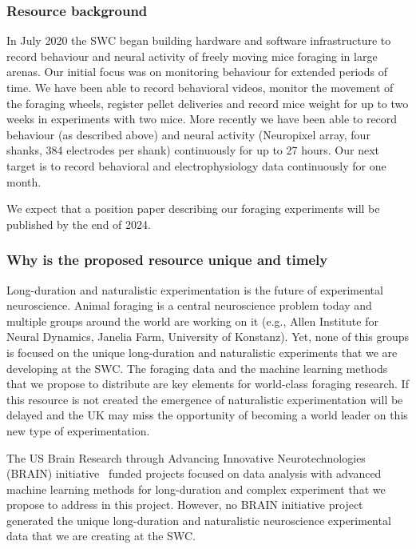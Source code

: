 \subsubsection*{Resource background}

In July 2020 the SWC began building hardware and software infrastructure to
record behaviour and neural activity of freely moving mice foraging in large
arenas. Our initial focus was on monitoring behaviour for extended periods of
time. We have been able to record behavioral videos, monitor the movement of
the foraging wheels, register pellet deliveries and record mice weight for up
to two weeks in experiments with two mice.
%
More recently we have been able to record behaviour (as described above) and
neural activity (Neuropixel array, four shanks, 384 electrodes per shank)
continuously for up to 27 hours.
%
Our next target is to record behavioral and electrophysiology data continuously
for one month.

We expect that a position paper describing our foraging experiments will be
published by the end of 2024.

\subsubsection*{Why is the proposed resource unique and timely}


Long-duration and naturalistic experimentation is the future of experimental
neuroscience.  Animal foraging is a central neuroscience problem today and
multiple groups around the world are working on it (e.g., Allen Institute for
Neural Dynamics, Janelia Farm, University of Konstanz). Yet, none of this
groups is focused on the unique long-duration and naturalistic experiments that
we are developing at the SWC.
%
The foraging data and the machine learning methods that we propose to
distribute are key elements for world-class foraging research.
%
If this resource is not created the emergence of naturalistic experimentation
will be delayed and the UK may miss the opportunity of becoming a world leader
on this new type of experimentation.

The US Brain Research through Advancing Innovative Neurotechnologies (BRAIN)
initiative~\citep{jorgensonEtAl15} funded projects focused on data analysis
with advanced machine learning methods for long-duration and complex experiment
that we propose to address in this project. However, no BRAIN initiative
project generated the unique long-duration and naturalistic neuroscience
experimental data that we are creating at the SWC.

